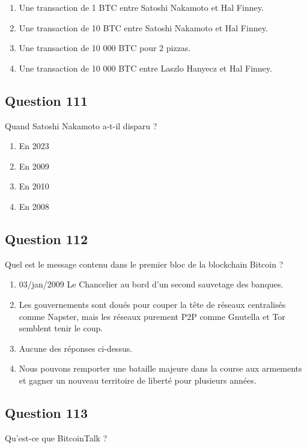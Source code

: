 \documentclass[12pt,a4paper]{article}
\begin{document}
\begin{enumerate}[label=\Alph*., leftmargin=*]
\item Une transaction de 1 BTC entre Satoshi Nakamoto et Hal Finney.
\item Une transaction de 10 BTC entre Satoshi Nakamoto et Hal Finney.
\item Une transaction de 10 000 BTC pour 2 pizzas.
\item Une transaction de 10 000 BTC entre Laszlo Hanyecz et Hal Finney.
\end{enumerate}

\bigskip


\subsection*{Question 111}
Quand Satoshi Nakamoto a-t-il disparu ?

\begin{enumerate}[label=\Alph*., leftmargin=*]
\item En 2023
\item En 2009
\item En 2010
\item En 2008
\end{enumerate}

\bigskip


\subsection*{Question 112}
Quel est le message contenu dans le premier bloc de la blockchain Bitcoin ?

\begin{enumerate}[label=\Alph*., leftmargin=*]
\item 03/jan/2009 Le Chancelier au bord d'un second sauvetage des banques.
\item Les gouvernements sont doués pour couper la tête de réseaux centralisés comme Napster, mais les réseaux purement P2P comme Gnutella et Tor semblent tenir le coup.
\item Aucune des réponses ci-dessus.
\item Nous pouvons remporter une bataille majeure dans la course aux armements et gagner un nouveau territoire de liberté pour plusieurs années.
\end{enumerate}

\bigskip


\subsection*{Question 113}
Qu'est-ce que BitcoinTalk ?
\end{document}
